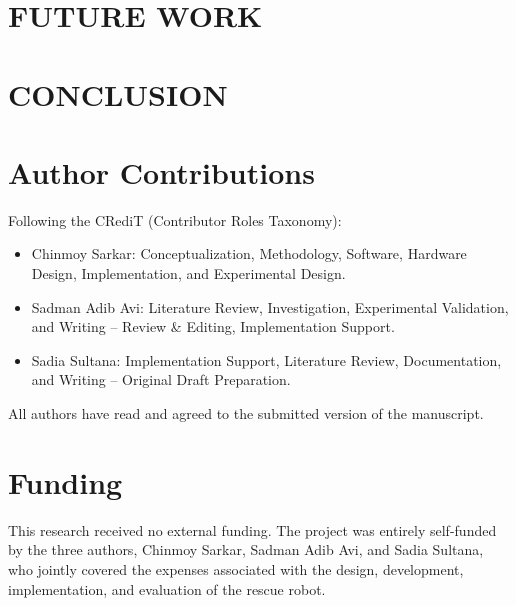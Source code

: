 \documentclass[12pt,a4paper]{report}
\begin{document}
\chapter{FUTURE WORK}



\chapter{CONCLUSION}


\clearpage
{}
\chapter*{Author Contributions}

Following the CRediT (Contributor Roles Taxonomy):

\begin{itemize}
\item Chinmoy Sarkar: Conceptualization, Methodology, Software, Hardware Design, Implementation, and Experimental Design.
\item Sadman Adib Avi: Literature Review, Investigation, Experimental Validation, and Writing -- Review \& Editing, Implementation Support.
\item Sadia Sultana: Implementation Support, Literature Review, Documentation, and Writing -- Original Draft Preparation.
\end{itemize}

All authors have read and agreed to the submitted version of the manuscript.

\chapter*{Funding}

This research received no external funding. The project was entirely self-funded by the three authors, Chinmoy Sarkar, Sadman Adib Avi, and Sadia Sultana, who jointly covered the expenses associated with the design, development, implementation, and evaluation of the rescue robot.
\end{document}

